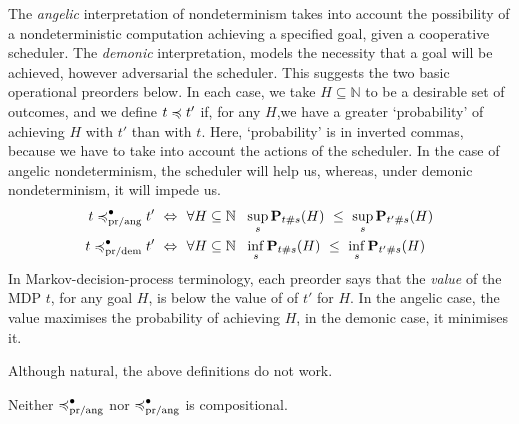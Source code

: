 
The  \emph{angelic} interpretation of nondeterminism takes into account the possibility of a nondeterministic computation achieving a specified goal, given a cooperative scheduler.  The  \emph{demonic} interpretation, 
models the {necessity} that a goal will be achieved, however adversarial the scheduler. 
This suggests the  two  basic operational preorders below. In each case, we take $H \subseteq \mathbb{N}$ to be a desirable set of outcomes, and we define $t \preccurlyeq t'$ if, for any $H$,we have a greater  `probability' of achieving $H$ with $t'$ than with $t$. Here, `probability' is in inverted commas, because we have to take into account the actions of the scheduler. In the case of 
angelic nondeterminism, the scheduler will help us, whereas, under demonic nondeterminism, it will impede us.
\begin{align*}
t \preccurlyeq^\bullet_{\text{pr/ang}} t' ~ \Leftrightarrow ~ ~& \forall H \subseteq \mathbb{N}  ~~ \sup_s  \mathbf{P}_{t\#s} (H)~ \leq~ \sup_s \mathbf{P}_{t'\#s} (H)
\\
t \preccurlyeq^\bullet_{\text{pr/dem}} t' ~ \Leftrightarrow ~ ~&  \forall H \subseteq \mathbb{N}  ~~ \inf_s  \mathbf{P}_{t\#s} (H)~ \leq~ \inf_s \mathbf{P}_{t'\#s} (H)
\end{align*}
In Markov-decision-process terminology, each preorder says that the \emph{value} of the MDP $t$, for any goal $H$, is below the value of of $t'$ for $H$. In the angelic case, the value maximises the probability of achieving $H$, in the demonic case, it minimises it. 

Although natural, the above definitions do not work. 
\begin{proposition}
Neither $\preccurlyeq^\bullet_{\text{pr/ang}}$ nor $\preccurlyeq^\bullet_{\text{pr/ang}}$ is compositional. 
\end{proposition}

